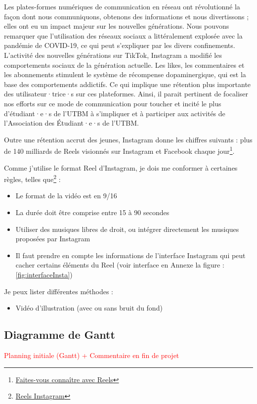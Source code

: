 Les plates-formes numériques de communication en réseau ont révolutionné la façon dont nous communiquons, obtenons des informations et nous divertissons ; elles ont eu un impact majeur sur les nouvelles générations.
Nous pouvons remarquer que l'utilisation des réseaux sociaux a littéralement explosée avec la pandémie de COVID-19, ce qui peut s'expliquer par les divers confinements.
L'activité des nouvelles générations sur TikTok, Instagram a modifié les comportements sociaux de la génération actuelle.
Les likes, les commentaires et les abonnements stimulent le système de récompense dopaminergique, qui est la base des comportements addictifs\cite{pedrouzo2023hyperconnected}.
Ce qui implique une rétention plus importante des utilisateur·trice·s sur ces plateformes.
Ainsi, il parait pertinent de focaliser nos efforts sur ce mode de communication pour toucher et incité le plus d'étudiant·e·s de l'UTBM à s'impliquer et à participer aux activités de l'Association des Étudiant·e·s de l'UTBM.

Outre une rétention accrut des jeunes, Instagram donne les chiffres suivants : plus de 140 milliards de Reels visionnés sur Instagram et Facebook chaque jour\footnote{\href{https://business.instagram.com/instagram-reels?locale=fr_FR}{Faites-vous connaître avec Reels}}.

Comme j'utilise le format Reel d'Instagram, je dois me conformer à certaines règles, telles que\footnote{\href{https://about.instagram.com/fr-fr/features/reels}{Reels Instagram}} :
\begin{itemize}
    \item Le format de la vidéo est en 9/16
    \item La durée doit être comprise entre 15 à 90 secondes
    \item Utiliser des musiques libres de droit, ou intégrer directement les musiques proposées par Instagram
    \item Il faut prendre en compte les informations de l'interface Instagram qui peut cacher certains éléments du Reel (voir interface en Annexe la figure : \ref{fig:interfaceInsta})
\end{itemize}


Je peux lister différentes méthodes :
\begin{itemize}
    \item Vidéo d'illustration (avec ou sans bruit du fond)
\end{itemize}

\subsection{Diagramme de Gantt}\label{subsec:diagramme-de-gantt}


\textcolor{red}{Planning initiale  (Gantt) + Commentaire en fin de projet}




